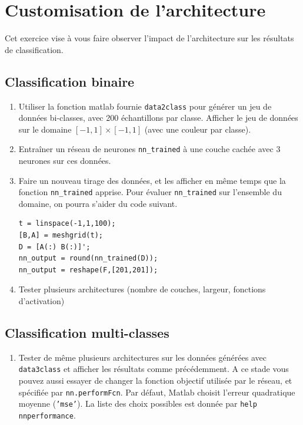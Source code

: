 \section{Customisation de l'architecture}

Cet exercice vise à vous faire observer l'impact de l'architecture sur les résultats de classification. 

\subsection{Classification binaire}

\begin{enumerate}
	\item Utiliser la fonction matlab fournie \texttt{data2class} pour générer un jeu de données bi-classes, avec 200 échantillons par classe. Afficher le jeu de données sur le domaine $[-1,1]\times [-1,1]$ (avec une couleur par classe).
	
	\item Entraîner un réseau de neurones \texttt{nn\_trained} à une couche cachée avec 3 neurones sur ces données.
	
	\item Faire un nouveau tirage des données, et les afficher en même temps que la fonction  \texttt{nn\_trained} apprise. Pour évaluer \texttt{nn\_trained} sur l'ensemble du domaine, on pourra s'aider du code suivant.
\begin{lstlisting}
t = linspace(-1,1,100);
[B,A] = meshgrid(t);
D = [A(:) B(:)]';
nn_output = round(nn_trained(D));
nn_output = reshape(F,[201,201]);
\end{lstlisting}

	\item Tester plusieurs architectures (nombre de couches, largeur, fonctions d'activation)
\end{enumerate}


\subsection{Classification multi-classes}

\begin{enumerate}
	\item Tester de même plusieurs architectures sur les données générées avec \texttt{data3class} et afficher les résultats comme précédemment. A ce stade vous pouvez aussi essayer de changer la fonction objectif utilisée par le réseau, et spécifiée par \texttt{nn.performFcn}. Par défaut, Matlab choisit l'erreur quadratique moyenne (\texttt{'mse'}). La liste des choix possibles est donnée par \texttt{help nnperformance}.
\end{enumerate}
